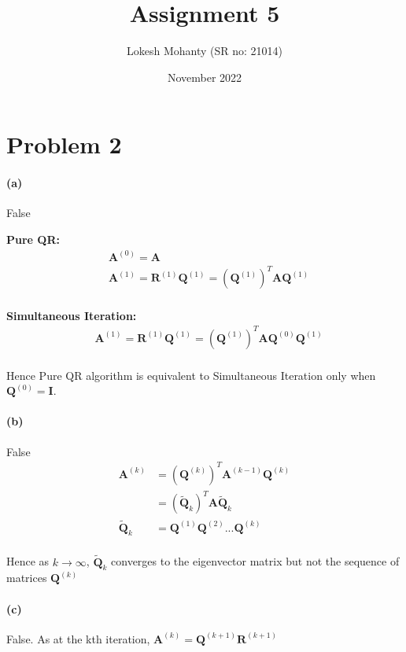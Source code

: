 \documentclass[12pt, letterpaper]{article}
\title{Assignment 5}
\author{Lokesh Mohanty (SR no: 21014)}
\date{November 2022}
\begin{document}
\fontsize{14pt}{18pt}\selectfont

\maketitle



\section*{Problem 2}

\paragraph{(a)} False

\textbf{Pure QR:}
\begin{align*}
  &\mathbf{A}^{(0)} = \mathbf{A} \\
  &\mathbf{A}^{(1)} = \mathbf{R}^{(1)}\mathbf{Q}^{(1)}
  = (\mathbf{Q}^{(1)})^T\mathbf{A}\mathbf{Q}^{(1)} \\
\end{align*}

\textbf{Simultaneous Iteration:}
\begin{align*}
  &\mathbf{A}^{(1)} = \mathbf{R}^{(1)}\mathbf{Q}^{(1)}
  = (\mathbf{Q}^{(1)})^T\mathbf{A}\mathbf{Q}^{(0)}\mathbf{Q}^{(1)} \\
\end{align*}

Hence Pure QR algorithm is equivalent to Simultaneous Iteration only when $\mathbf{Q}^{(0)} = \mathbf{I}$.

\paragraph{(b)} False
\begin{align*}
  \mathbf{A}^{(k)} &= (\mathbf{Q}^{(k)})^T\mathbf{A}^{(k-1)}\mathbf{Q}^{(k)} \\
  &= (\mathbf{\tilde{Q}}_k)^T \mathbf{A} \mathbf{\tilde{Q}}_k \\
  \mathbf{\tilde{Q}}_k &= \mathbf{Q}^{(1)}\mathbf{Q}^{(2)}...\mathbf{Q}^{(k)} \\
\end{align*}

Hence as $k \rightarrow \infty$, $\mathbf{\tilde{Q}}_k$ converges to the eigenvector matrix but not the sequence of matrices $\mathbf{Q}^{(k)}$

\paragraph{(c)} False. As at the kth iteration,
$\mathbf{A}^{(k)} = \mathbf{Q}^{(k+1)}\mathbf{R}^{(k+1)}$
\end{document}
